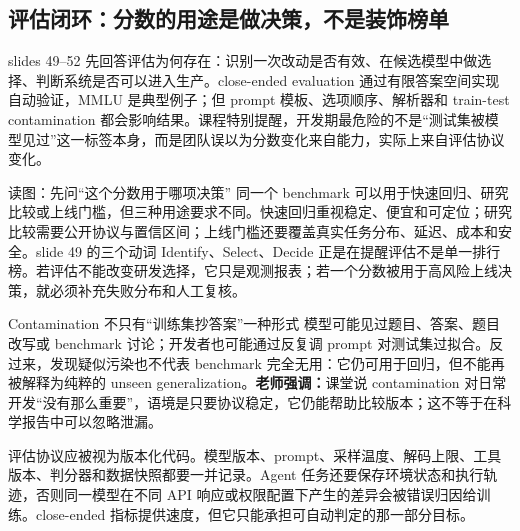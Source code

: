 \subsection{评估闭环：分数的用途是做决策，不是装饰榜单}

slides 49--52 先回答评估为何存在：识别一次改动是否有效、在候选模型中做选择、判断系统是否可以进入生产。close-ended evaluation 通过有限答案空间实现自动验证，MMLU 是典型例子；但 prompt 模板、选项顺序、解析器和 train-test contamination 都会影响结果。课程特别提醒，开发期最危险的不是“测试集被模型见过”这一标签本身，而是团队误以为分数变化来自能力，实际上来自评估协议变化。


\begin{knowledgebox}{读图：先问“这个分数用于哪项决策”}
同一个 benchmark 可以用于快速回归、研究比较或上线门槛，但三种用途要求不同。快速回归重视稳定、便宜和可定位；研究比较需要公开协议与置信区间；上线门槛还要覆盖真实任务分布、延迟、成本和安全。slide 49 的三个动词 Identify、Select、Decide 正是在提醒评估不是单一排行榜。若评估不能改变研发选择，它只是观测报表；若一个分数被用于高风险上线决策，就必须补充失败分布和人工复核。
\end{knowledgebox}

\begin{warningbox}{Contamination 不只有“训练集抄答案”一种形式}
模型可能见过题目、答案、题目改写或 benchmark 讨论；开发者也可能通过反复调 prompt 对测试集过拟合。反过来，发现疑似污染也不代表 benchmark 完全无用：它仍可用于回归，但不能再被解释为纯粹的 unseen generalization。\textbf{老师强调：}课堂说 contamination 对日常开发“没有那么重要”，语境是只要协议稳定，它仍能帮助比较版本；这不等于在科学报告中可以忽略泄漏。
\end{warningbox}

评估协议应被视为版本化代码。模型版本、prompt、采样温度、解码上限、工具版本、判分器和数据快照都要一并记录。Agent 任务还要保存环境状态和执行轨迹，否则同一模型在不同 API 响应或权限配置下产生的差异会被错误归因给训练。close-ended 指标提供速度，但它只能承担可自动判定的那一部分目标。

